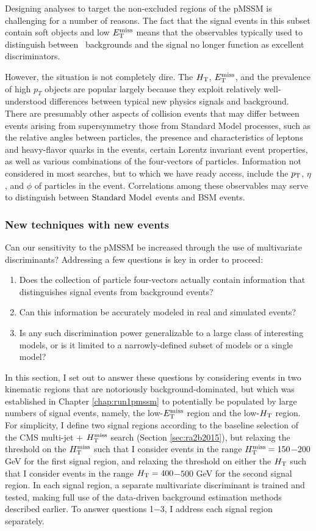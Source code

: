 
Designing analyses to target the non-excluded regions of the pMSSM is challenging for a number of reasons. The fact that the signal events in this subset contain soft objects and low $E_{\text{T}}^{\rm miss}$ means that the observables typically used to distinguish between \SM~backgrounds and the signal no longer function as excellent discriminators. 

However, the situation is not completely dire. The  $H_{\rm T}$, $E_{\text{T}}^{\rm miss}$, and the prevalence of high $p_{T}$ objects are popular largely because they exploit relatively well-understood differences between typical new physics signals and background. There are presumably other aspects of collision events that may differ between events arising from supersymmetry those from Standard Model processes, such as the relative angles between particles, the presence and characteristics of leptons and heavy-flavor quarks in the events, certain Lorentz invariant event properties, as well as various combinations of the four-vectors of particles. Information not considered in most searches, but to which we have ready access, include the $p_{\text{T}}$, $\eta$, and $\phi$ of particles in the event. Correlations among these observables may serve to distinguish between $\text{Standard\ Model}$ events and BSM events. 

\subsubsection{New techniques with new events}
Can our sensitivity to the pMSSM be increased through the use of multivariate discriminants? Addressing a few questions is key in order to proceed: 
\begin{enumerate}
\item Does the collection of particle four-vectors actually contain information that distinguishes signal events from background events?
\item Can this information be accurately modeled in real and simulated events?
\item Is any such discrimination power generalizable to a large class of interesting models, or is it limited to a narrowly-defined subset of models or a single model?
\end{enumerate}
In this section, I set out to answer these questions by considering events in two kinematic regions that are notoriously background-dominated, but which was established in Chapter \ref{chap:run1pmssm} to potentially be populated by large numbers of signal events, namely, the low-$E_{\text{T}}^{\rm miss}$ region and the low-$H_{\rm T}$ region. For simplicity, I define two signal regions according to the baseline selection of the CMS multi-jet $+$ $H_{\text{T}}^{\rm miss}$ search (Section \ref{sec:ra2b2015}), but relaxing the threshold on the $H_{\text{T}}^{\rm miss}$  such that I consider events in the range $H_{\text{T}}^{\rm miss}=150$$-$$200$ GeV for the first signal region, and relaxing the threshold on either the $H_{\rm T}$  such that I consider events in the range $H_{\rm T}=400$$-$$500$ GeV for the second signal region. In each signal region, a separate multivariate discriminant is trained and tested, making full use of the data-driven background estimation methods described earlier. To answer questions 1$-$3, I address each signal region separately.

